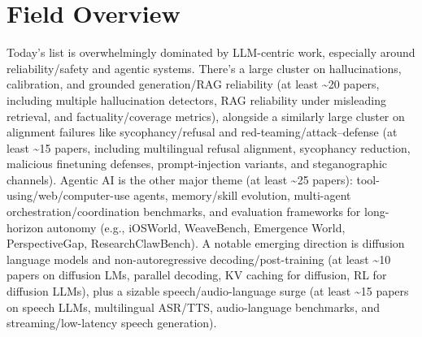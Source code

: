 \documentclass[12pt,letterpaper]{article}
\begin{document}
\medskip



\section*{Field Overview}
{\footnotesize Today's list is overwhelmingly dominated by LLM-centric work, especially around reliability/safety and agentic systems. There's a large cluster on hallucinations, calibration, and grounded generation/RAG reliability (at least \textasciitilde{}20 papers, including multiple hallucination detectors, RAG reliability under misleading retrieval, and factuality/coverage metrics), alongside a similarly large cluster on alignment failures like sycophancy/refusal and red-teaming/attack--defense (at least \textasciitilde{}15 papers, including multilingual refusal alignment, sycophancy reduction, malicious finetuning defenses, prompt-injection variants, and steganographic channels). Agentic AI is the other major theme (at least \textasciitilde{}25 papers): tool-using/web/computer-use agents, memory/skill evolution, multi-agent orchestration/coordination benchmarks, and evaluation frameworks for long-horizon autonomy (e.g., iOSWorld, WeaveBench, Emergence World, PerspectiveGap, ResearchClawBench). A notable emerging direction is diffusion language models and non-autoregressive decoding/post-training (at least \textasciitilde{}10 papers on diffusion LMs, parallel decoding, KV caching for diffusion, RL for diffusion LLMs), plus a sizable speech/audio-language surge (at least \textasciitilde{}15 papers on speech LLMs, multilingual ASR/TTS, audio-language benchmarks, and streaming/low-latency speech generation).}
\end{document}
